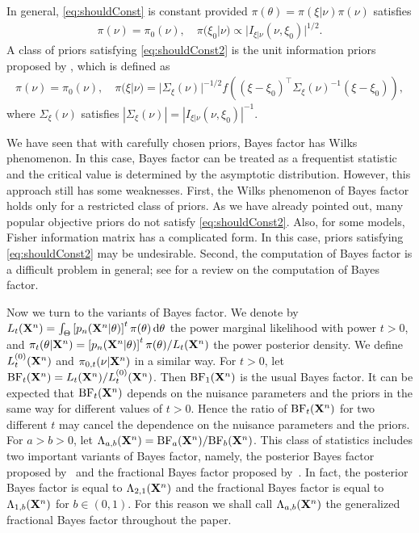 \documentclass[11pt]{article}
\theoremstyle{plain}
\theoremstyle{definition}
\theoremstyle{remark}
\begin{document}
In general, \eqref{eq:shouldConst} is constant provided $\pi(\theta) = \pi (\xi |\nu) \pi(\nu)$ satisfies
\begin{align}\label{eq:shouldConst2}
    \pi(\nu) = \pi_0 (\nu), \quad \pi(\xi_0 | \nu) \propto |I_{\xi | \nu} (\nu,\xi_0)|^{1/2}.
\end{align}
A class of priors satisfying \eqref{eq:shouldConst2} is the unit information priors proposed by \cite{Kass1995}, which is defined as
\begin{align*}
    \pi(\nu) = \pi_0 (\nu), \quad \pi(\xi | \nu) = |\Sigma_\xi(\nu)|^{-1/2} f\left((\xi - \xi_0)^\top \Sigma_\xi(\nu)^{-1} ( \xi - \xi_0)\right),
\end{align*}
where $\Sigma_{\xi}(\nu)$ satisfies
$
|\Sigma_{\xi}(\nu)|= |I_{\xi | \nu} (\nu,\xi_0)|^{-1}
$.

We have seen that with carefully chosen priors, Bayes factor has Wilks phenomenon.
In this case, Bayes factor can be treated as a frequentist statistic and the critical value is determined by the asymptotic distribution.
However, this approach still has some weaknesses.
First, the Wilks phenomenon of Bayes factor holds only for a restricted class of priors. %
As we have already pointed out, many popular objective priors do not satisfy \eqref{eq:shouldConst2}.
Also, for some models, Fisher information matrix has a complicated form.
In this case, priors satisfying \eqref{eq:shouldConst2} may be undesirable.
Second, the computation of Bayes factor is a difficult problem in general; see \cite{Friel2012} for a review on the computation of Bayes factor.

Now we turn to the variants of Bayes factor.
We denote by
$L_t(\mathbf{X}^{n})=\int_{\Theta}\left[p_n(\mathbf{X}^{n}|\theta)\right]^t \pi(\theta)\, \mathrm d\theta$
the power marginal likelihood with power $t>0$,
and $\pi_t (\theta | \mathbf{X}^n) = \left[p_n(\mathbf{X}^{n}|\theta)\right]^t \pi(\theta)/ L_t (\mathbf{X}^n)$ the power  posterior density.
We define $L_t^{(0)}(\mathbf{X}^{n})$ and $\pi_{0, t} (\nu | \mathbf{X}^n)$ in a similar way.
For $t > 0$, let $\text{BF}_t (\mathbf{X}^n) = L_t(\mathbf{X}^n)/ L_t^{(0)} (\mathbf{X}^n)$.
Then $\text{BF}_1(\mathbf{X}^n)$ is the usual Bayes factor.
It can be expected that $\text{BF}_t (\mathbf{X}^n)$ depends on the nuisance parameters and the priors in the same way for different values of $t>0$.
Hence the ratio of $\text{BF}_t (\mathbf{X}^n)$ for two different $t$ may cancel the dependence on the nuisance parameters and the priors.
For $a>b>0$, let
$
\Lambda_{a,b} (\mathbf{X}^n) =
    \text{BF}_a (\mathbf{X}^n)/
    \text{BF}_b (\mathbf{X}^n)
    $.
    This class of statistics includes two important variants of Bayes factor, namely, the posterior Bayes factor proposed by~\cite{Aitkin1991Posterior} and the fractional Bayes factor proposed by~\cite{Fractional1995}.
    In fact, the posterior Bayes factor is equal to $\Lambda_{2,1}(\mathbf{X}^n)$ and the fractional Bayes factor is equal to $\Lambda_{1,b}(\mathbf{X}^n)$ for $b\in (0,1)$.
    For this reason we shall call $\Lambda_{a,b} (\mathbf{X}^n)$ the generalized fractional Bayes factor throughout the paper.
\end{document}
